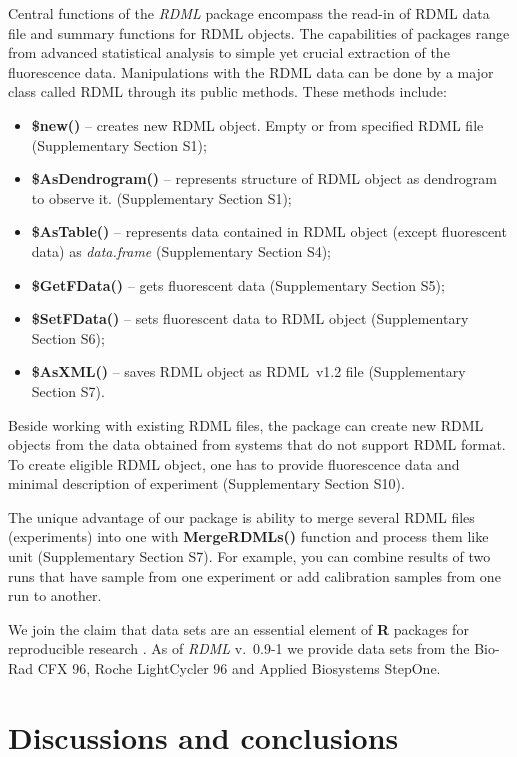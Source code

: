 \documentclass{bioinfo}
\begin{document}
	Central functions of the \textit{RDML} package encompass the read-in of RDML
	data file and summary functions for RDML objects. The capabilities of packages range 
	from advanced statistical analysis to simple yet crucial extraction of the fluorescence 
	data. Manipulations with the RDML data can be done by a major class called RDML
	through
	its public methods. These methods include: \begin{itemize} \item
		\textbf{\$new()} -- creates new RDML object. Empty or from specified RDML file
		(Supplementary Section S1); \item \textbf{\$AsDendrogram()} -- represents
		structure of RDML object as dendrogram to observe it. (Supplementary Section
		S1); \item \textbf{\$AsTable()} -- represents data contained in RDML object
		(except fluorescent data) as \textit{data.frame} (Supplementary Section S4);
		\item \textbf{\$GetFData()} -- gets fluorescent data (Supplementary Section S5);
		\item \textbf{\$SetFData()} -- sets fluorescent data to RDML object
		(Supplementary Section S6); \item \textbf{\$AsXML()} -- saves RDML object as
		RDML~v1.2 file (Supplementary Section S7). \end{itemize}
	
	Beside working with existing RDML files, the package can create new RDML objects from
	the data obtained from systems that do not support RDML format. To create eligible RDML 
	object, one has to provide fluorescence data and minimal description of experiment
	(Supplementary Section S10).
	
	The unique advantage of our package is ability to merge several RDML files
	(experiments) into one with \textbf{MergeRDMLs()} function and process them like
	unit (Supplementary Section S7). For example, you can combine results of two
	runs that have sample from one experiment or add calibration samples from one
	run to another.
	
	We join the claim that data sets are an essential element of \textbf{R} packages 
	for reproducible research \cite{gentleman_2004,hofmann_2013,Leeper_2014}. 
	As of \textit{RDML} v.~0.9-1 we provide data sets from the Bio-Rad CFX 96, Roche 
	LightCycler 96 and Applied Biosystems StepOne.
	
	\section{Discussions and conclusions}
	
\end{document}
